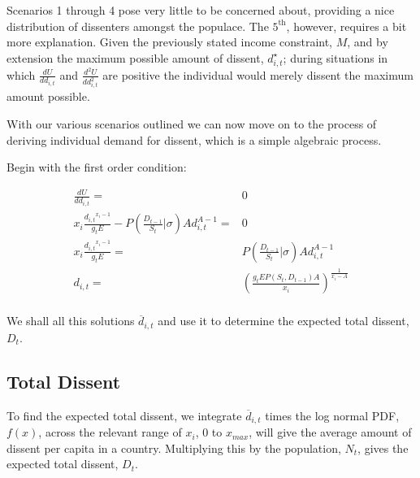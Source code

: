 \documentclass[12pt]{article}
\begin{document}
\begin{spacing}{1.5}
Scenarios 1 through 4 pose very little to be concerned about, providing a nice distribution of dissenters amongst the populace. The $\text{5}^{\text{th}}$, however, requires a bit more explanation. Given the previously stated income constraint, $M$, and by extension the maximum possible amount of dissent, $d_{i,t}^\star$; during situations in which $\frac{dU}{dd_{i,t}}$ and $\frac{d^2U}{dd_{i,t}^2}$ are positive the individual would merely dissent the maximum amount possible.  

With our various scenarios outlined we can now move on to the process of deriving individual demand for dissent, which is a simple algebraic process. 

\vspace{1 em}
\noindent Begin with the first order condition: 

\begin{equation}
	\begin{aligned}
\frac{dU}{dd_{i,t}}=& 0\\ 
x_i \frac{{d_{i,t}}^{x_i -1}}{g_t E} - P\left(\frac{D_{t-1}}{S_t}\Big|\sigma \right)Ad_{i,t}^{A-1}=& 0 \\
	x_i \frac{{d_{i,t}}^{x_i -1}}{g_t E} =& P\left(\frac{D_{t-1}}{S_t}\Big|\sigma \right)Ad_{i,t}^{A-1}\\
		d_{i,t}=& \left(\frac{g_tEP(S_t,D_{t-1})A}{x_i} \right)^{\frac{1}{x_i -A}}\\ 	
	\end{aligned}
\end{equation}

We shall all this solutions $\overline{d}_{i,t}$ and use it to determine the expected total dissent, $D_t$. 

   
\subsection{Total Dissent}
 
To find the expected total dissent, we integrate $\overline{d}_{i,t}$ times the log normal PDF, $f(x)$, across the relevant range of $x_i$, $0$ to $x_{max}$, will give the average amount of dissent per capita in a country. Multiplying this by the population, $N_t$, gives the expected total dissent, $D_t$.


\end{spacing}
\end{document}
